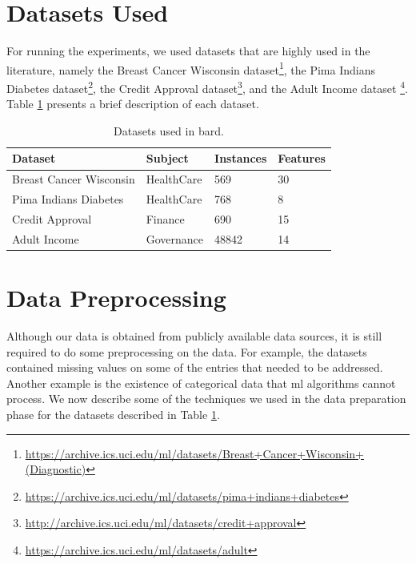 



\section{Datasets Used}
\label{sec:DatasetsImplementation}

For running the experiments, we used datasets that are highly used in the literature, namely the Breast Cancer Wisconsin dataset\footnote{\url{https://archive.ics.uci.edu/ml/datasets/Breast+Cancer+Wisconsin+(Diagnostic)}}, the Pima Indians Diabetes dataset\footnote{\url{https://archive.ics.uci.edu/ml/datasets/pima+indians+diabetes}}, the Credit Approval dataset\footnote{\url{http://archive.ics.uci.edu/ml/datasets/credit+approval}}, and the Adult Income dataset \footnote{\url{https://archive.ics.uci.edu/ml/datasets/adult}}. Table \ref{table:datasets} presents a brief description of each dataset.

\begin{table}[H]
\centering
\caption{Datasets used in \ac{bard}.}
\label{table:datasets}
\begin{tabular}{|l|l|l|l|}
\hline
\textbf{Dataset} & \textbf{Subject} & \textbf{Instances} & \textbf{Features} \\ \hline
 Breast Cancer Wisconsin  &  HealthCare  & 569    & 30       \\ \hline
 Pima Indians Diabetes    &  HealthCare  & 768    &  8       \\ \hline
 Credit Approval          &  Finance     & 690    & 15       \\ \hline
 Adult Income             &  Governance  & 48842  & 14       \\ \hline 
\end{tabular}
\end{table}



\section{Data Preprocessing}
\label{sec:DataPreProcessingImplementation}

Although our data is obtained from publicly available data sources, it is still required to do some preprocessing on the data.
For example, the datasets contained missing values on some of the entries that needed to be addressed. Another example is the existence of categorical data that \ac{ml} algorithms cannot process. We now describe some of the techniques we used in the data preparation phase for the datasets described in Table \ref{table:datasets}.

